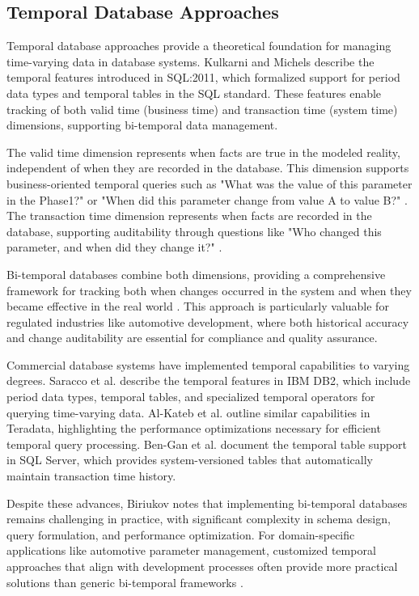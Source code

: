 \subsection{Temporal Database Approaches}
\label{subsec:temporal-database-approaches}

Temporal database approaches provide a theoretical foundation for managing time-varying data in database systems. Kulkarni and Michels \cite{kulkarni2012temporal} describe the temporal features introduced in SQL:2011, which formalized support for period data types and temporal tables in the SQL standard. These features enable tracking of both valid time (business time) and transaction time (system time) dimensions, supporting bi-temporal data management.

The valid time dimension represents when facts are true in the modeled reality, independent of when they are recorded in the database. This dimension supports business-oriented temporal queries such as "What was the value of this parameter in the Phase1?" or "When did this parameter change from value A to value B?" \cite{bohlen2018database}. The transaction time dimension represents when facts are recorded in the database, supporting auditability through questions like "Who changed this parameter, and when did they change it?" \cite{kulkarni2012temporal}.

Bi-temporal databases combine both dimensions, providing a comprehensive framework for tracking both when changes occurred in the system and when they became effective in the real world \cite{bohlen2018database}. This approach is particularly valuable for regulated industries like automotive development, where both historical accuracy and change auditability are essential for compliance and quality assurance.

Commercial database systems have implemented temporal capabilities to varying degrees. Saracco et al. \cite{saracco2010matter} describe the temporal features in IBM DB2, which include period data types, temporal tables, and specialized temporal operators for querying time-varying data. Al-Kateb et al. \cite{al2013temporal} outline similar capabilities in Teradata, highlighting the performance optimizations necessary for efficient temporal query processing. Ben-Gan et al. \cite{ben2017mcsa} document the temporal table support in SQL Server, which provides system-versioned tables that automatically maintain transaction time history.

Despite these advances, Biriukov \cite{biriukov2018implementation} notes that implementing bi-temporal databases remains challenging in practice, with significant complexity in schema design, query formulation, and performance optimization. For domain-specific applications like automotive parameter management, customized temporal approaches that align with development processes often provide more practical solutions than generic bi-temporal frameworks \cite{biriukov2018implementation}.

